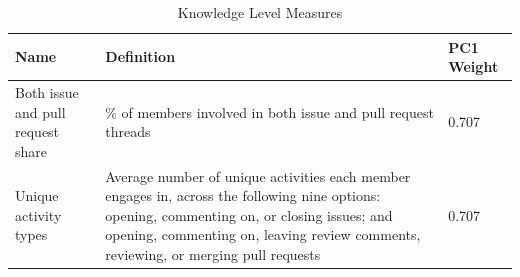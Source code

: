 \begin{longtable}{>{\raggedright\arraybackslash}p{} p{}p{}}
\caption{Knowledge Level Measures}\label{tab:knowledge_level_metrics}\\
\toprule
\textbf{Name} & \textbf{Definition} &\textbf{PC1 Weight} \\
\midrule
\endfirsthead

\bottomrule
\endlastfoot


Both issue and pull request share & \% of members involved in both issue and pull request threads & 0.707 \\
Unique activity types & Average number of unique activities each member engages in, across the following nine options: opening, commenting on, or closing issues; and opening, commenting on, leaving review comments, reviewing, or merging pull requests & 0.707 \\
\end{longtable}


